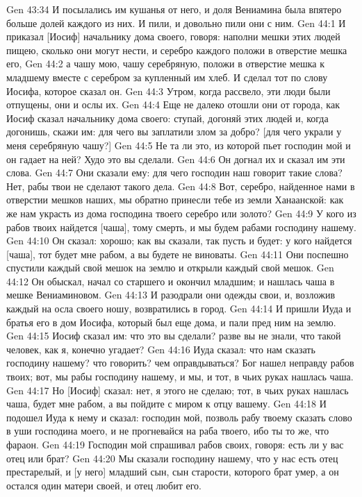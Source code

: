 \vs Gen 43:34 И посылались им кушанья от него, и доля Вениамина была впятеро больше долей каждого из них. И пили, и довольно пили они с ним.
\vs Gen 44:1 И приказал [Иосиф] начальнику дома своего, говоря: наполни мешки этих людей пищею, сколько они могут нести, и серебро каждого положи в отверстие мешка его,
\vs Gen 44:2 а чашу мою, чашу серебряную, положи в отверстие мешка к младшему вместе с серебром за купленный им хлеб. И сделал тот по слову Иосифа, которое сказал он.
\vs Gen 44:3 Утром, когда рассвело, эти люди были отпущены, они и ослы их.
\vs Gen 44:4 Еще не далеко отошли они от города, как Иосиф сказал начальнику дома своего: ступай, догоняй этих людей и, когда догонишь, скажи им: для чего вы заплатили злом за добро? [для чего украли у меня серебряную чашу?]
\vs Gen 44:5 Не та ли это, из которой пьет господин мой и он гадает на ней? Худо это вы сделали.
\vs Gen 44:6 Он догнал их и сказал им эти слова.
\vs Gen 44:7 Они сказали ему: для чего господин наш говорит такие слова? Нет, рабы твои не сделают такого дела.
\vs Gen 44:8 Вот, серебро, найденное нами в отверстии мешков наших, мы обратно принесли тебе из земли Ханаанской: как же нам украсть из дома господина твоего серебро или золото?
\vs Gen 44:9 У кого из рабов твоих найдется [чаша], тому смерть, и мы будем рабами господину нашему.
\vs Gen 44:10 Он сказал: хорошо; как вы сказали, так пусть и будет: у кого найдется [чаша], тот будет мне рабом, а вы будете не виноваты.
\vs Gen 44:11 Они поспешно спустили каждый свой мешок на землю и открыли каждый свой мешок.
\vs Gen 44:12 Он обыскал, начал со старшего и окончил младшим; и нашлась чаша в мешке Вениаминовом.
\vs Gen 44:13 И разодрали они одежды свои, и, возложив каждый на осла своего ношу, возвратились в город.
\vs Gen 44:14 И пришли Иуда и братья его в дом Иосифа, который был еще дома, и пали пред ним на землю.
\vs Gen 44:15 Иосиф сказал им: что это вы сделали? разве вы не знали, что такой человек, как я, конечно угадает?
\vs Gen 44:16 Иуда сказал: что нам сказать господину нашему? что говорить? чем оправдываться? Бог нашел неправду рабов твоих; вот, мы рабы господину нашему, и мы, и тот, в чьих руках нашлась чаша.
\vs Gen 44:17 Но [Иосиф] сказал: нет, я этого не сделаю; тот, в чьих руках нашлась чаша, будет мне рабом, а вы пойдите с миром к отцу вашему.
\vs Gen 44:18 И подошел Иуда к нему и сказал: господин мой, позволь рабу твоему сказать слово в уши господина моего, и не прогневайся на раба твоего, ибо ты то же, что фараон.
\vs Gen 44:19 Господин мой спрашивал рабов своих, говоря: есть ли у вас отец или брат?
\vs Gen 44:20 Мы сказали господину нашему, что у нас есть отец престарелый, и [у него] младший сын, сын старости, которого брат умер, а он остался один  матери своей, и отец любит его.
